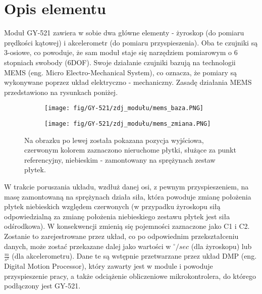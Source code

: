 \documentclass[11pt, a4paper]{article}
\institute{Instytut Robotyki i Inteligencji Maszynowej}
\begin{document}
\newpage

\section{Opis elementu} 
Moduł GY-521 zawiera w sobie dwa główne elementy - żyroskop (do pomiaru prędkości kątowej) i akcelerometr (do pomiaru przyspieszenia). Oba te czujniki są 3-osiowe, co powoduje, że sam moduł staje się narzędziem pomiarowym o 6 stopniach swobody (6DOF). Swoje działanie czujniki bazują na technologii MEMS (eng. Micro Electro-Mechanical System), co oznacza, że pomiary są wykonywane poprzez układ elektryczno - mechaniczny. Zasadę działania MEMS przedstawiono na rysunkach poniżej.

\begin{figure}[H]
\centering
\begin{subfigure}{.5\textwidth}
  \centering
  \texttt{[image: fig/GY-521/zdj\_modułu/mems\_baza.PNG]}
  \label{fig:sub1}
\end{subfigure}%
\begin{subfigure}{.5\textwidth}
  \centering
  \texttt{[image: fig/GY-521/zdj\_modułu/mems\_zmiana.PNG]}
  \label{fig:sub2}
\end{subfigure}
\caption{Na obrazku po lewej została pokazana pozycja wyjściowa, czerwonym kolorem zaznaczono nieruchome płytki, służące za punkt referencyjny, niebieskim - zamontowany na sprężynach zestaw płytek.}
\label{fig:test}
\end{figure}

W trakcie poruszania układu, wzdłuż danej osi, z pewnym przyspieszeniem, na masę zamontowaną na sprężynach działa siła, która powoduje zmianę położenia płytek niebieskich względem czerwonych (w przypadku żyroskopu siłą odpowiedzialną za zmianę położenia niebieskiego zestawu płytek jest siła odśrodkowa). W konsekwencji zmienią się pojemności zaznaczone jako C1 i C2. Zostanie to zarejestrowane przez układ, co po odpowiednim przekształceniu danych, może zostać przekazane dalej jako wartości w $^\circ/sec$ (dla żyroskopu) lub $\frac{m}{s^2}$ (dla akcelerometru). Dane te są wstępnie przetwarzane przez układ DMP (eng. Digital Motion Processor), który zawarty jest w module i powoduje przyspieszenie pracy, a także odciążenie obliczeniowe mikrokontrolera, do którego podłączony jest GY-521.
\end{document}
